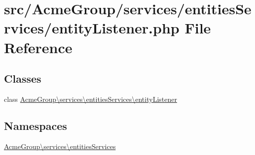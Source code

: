 \hypertarget{entity_listener_8php}{\section{src/\+Acme\+Group/services/entities\+Services/entity\+Listener.php File Reference}
\label{entity_listener_8php}
}
\subsection*{Classes}
\begin{DoxyCompactItemize}
\item 
class \hyperlink{class_acme_group_1_1services_1_1entities_services_1_1entity_listener}{Acme\+Group\textbackslash{}services\textbackslash{}entities\+Services\textbackslash{}entity\+Listener}
\end{DoxyCompactItemize}
\subsection*{Namespaces}
\begin{DoxyCompactItemize}
\item 
 \hyperlink{namespace_acme_group_1_1services_1_1entities_services}{Acme\+Group\textbackslash{}services\textbackslash{}entities\+Services}
\end{DoxyCompactItemize}
